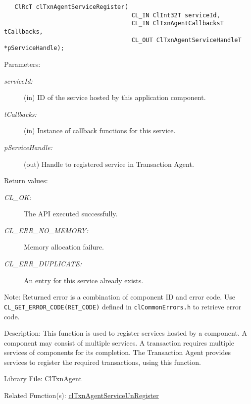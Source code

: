 \begin{flushleft}
\begin{Desc}
\footnotesize\begin{verbatim}   ClRcT clTxnAgentServiceRegister(
                            		CL_IN ClInt32T serviceId, 
                            		CL_IN ClTxnAgentCallbacksT tCallbacks, 
                            		CL_OUT ClTxnAgentServiceHandleT *pServiceHandle);
\end{verbatim}
\normalsize
\end{Desc}
\begin{Desc}
\item[Parameters:]
\begin{description}
\item[{\em service\-Id:}](in) ID of the service hosted by this application component. \item[{\em t\-Callbacks:}](in) Instance of callback functions 
for this service. \item[{\em p\-Service\-Handle:}](out) Handle to registered service in Transaction Agent.\end{description}
\end{Desc}
\begin{Desc}
\item[Return values:]
\begin{description}
\item[{\em CL\_\-OK:}]The API executed successfully. 
\item[{\em CL\_\-ERR\_\-NO\_\-MEMORY:}]Memory allocation failure. 
\item[{\em CL\_\-ERR\_\-DUPLICATE:}]An entry for this service already exists.\end{description}
\end{Desc}
\begin{Desc}
\item[Note:]Returned error is a combination of component ID and error code. Use {\tt{CL\_\-GET\_\-ERROR\_\-CODE(RET\_\-CODE)}} defined in 
{\tt{clCommonErrors.h}} to retrieve error code.\end{Desc}
\begin{Desc}
\item[Description:]This function is used to register services hosted by a component. A component may consist of multiple services. A transaction 
requires multiple services of components for its completion. The Transaction Agent provides services to register the required
transactions, using this function.\end{Desc}
\begin{Desc}
\item[Library File:]Cl\-Txn\-Agent\end{Desc}
\begin{Desc}
\item[Related Function(s):]\hyperlink{pagetxn204}{cl\-Txn\-Agent\-Service\-Un\-Register} \end{Desc}
\newpage



\end{flushleft}

